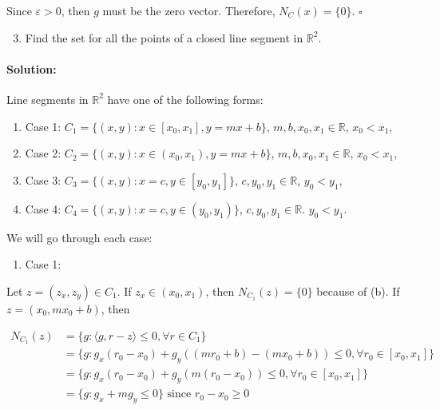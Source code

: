 \documentclass[10pt]{article}
\begin{document}
Since $\varepsilon > 0$, then $g$ must be the zero vector. Therefore, $N_C(x) = \{0\}$. $\square$




\hfill \break %

\begin{enumerate}[label=(\alph*)]
  \setcounter{enumi}{2}
  \item Find the set for all the points of a closed line segment in $\mathbb{R}^2$.
\end{enumerate}

\paragraph{Solution:}

Line segments in $\mathbb{R}^2$ have one of the following forms:

\begin{enumerate}
  \item Case 1: $C_1 = \{ (x,y): x \in [x_0, x_1], y = m x + b \}$, $m, b, x_0, x_1 \in \mathbb{R}$, $x_0 < x_1$,
  \item Case 2: $C_2 = \{ (x,y): x \in (x_0, x_1), y = m x + b \}$, $m, b, x_0, x_1 \in \mathbb{R}$, $x_0 < x_1$,
  \item Case 3: $C_3 = \{ (x,y): x=c, y \in [y_0, y_1] \}$, $c, y_0, y_1 \in \mathbb{R}$, $y_0 < y_1$,
  \item Case 4: $C_4 = \{ (x,y): x=c, y \in (y_0, y_1) \}$, $c, y_0, y_1 \in \mathbb{R}$. $y_0 < y_1$.
\end{enumerate}

We will go through each case:

\begin{enumerate}
  \item Case 1: 
\end{enumerate}

Let $z = (z_x, z_y) \in C_1$. If $z_x \in (x_0, x_1)$, then $N_{C_1}(z) = \{ 0 \}$ because of (b).
If $z = (x_0, m x_0 + b)$, then 

\begin{align*}
  N_{C_1}(z) &= \{ g: \langle g, r - z \rangle \leq 0, \forall r \in C_1 \}\\
  &= \{ g: g_x (r_0 - x_0) + g_y ((m r_0 + b) - (m x_0 + b)) \leq 0, \forall r_0 \in [x_0, x_1] \}\\
  &= \{ g: g_x (r_0 - x_0) + g_y (m (r_0 - x_0)) \leq 0, \forall r_0 \in [x_0, x_1] \}\\
  &= \{ g: g_x + m g_y \leq 0\} \text{ since $r_0 - x_0 \geq 0$}\\
\end{align*}
\end{document}
